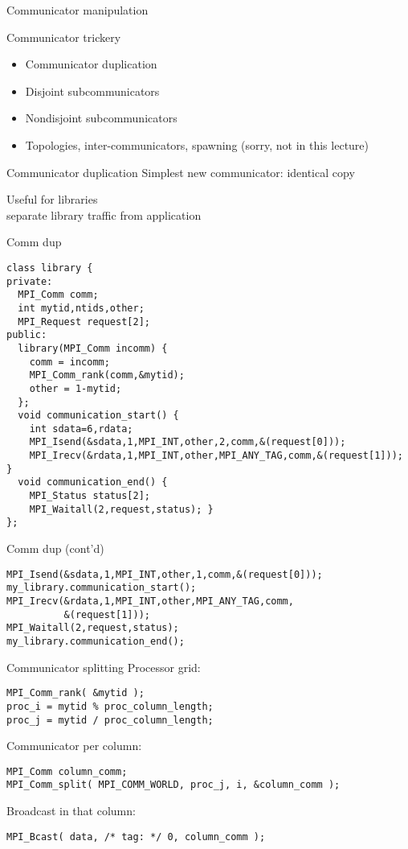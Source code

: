  {Communicator manipulation}

\begin{frame}[fragile]{Communicator trickery}
  \begin{itemize}
  \item Communicator duplication
  \item Disjoint subcommunicators
  \item Nondisjoint subcommunicators
  \item Topologies, inter-communicators, spawning (sorry, not in this lecture)
  \end{itemize}
\end{frame}

\begin{frame}[fragile]{Communicator duplication}
  Simplest new communicator: identical copy

  Useful for libraries\\
  separate library traffic from application
\end{frame}

\begin{frame}[fragile]{Comm dup}
\small
\begin{verbatim}
class library {
private:
  MPI_Comm comm;
  int mytid,ntids,other;
  MPI_Request request[2];
public:
  library(MPI_Comm incomm) {
    comm = incomm;
    MPI_Comm_rank(comm,&mytid);
    other = 1-mytid;
  };
  void communication_start() {
    int sdata=6,rdata;
    MPI_Isend(&sdata,1,MPI_INT,other,2,comm,&(request[0]));
    MPI_Irecv(&rdata,1,MPI_INT,other,MPI_ANY_TAG,comm,&(request[1])); }
  void communication_end() {
    MPI_Status status[2];
    MPI_Waitall(2,request,status); }
};
\end{verbatim}
\end{frame}

\begin{frame}[fragile]{Comm dup (cont'd)}
\small
\begin{verbatim}
MPI_Isend(&sdata,1,MPI_INT,other,1,comm,&(request[0]));
my_library.communication_start();
MPI_Irecv(&rdata,1,MPI_INT,other,MPI_ANY_TAG,comm,
          &(request[1]));
MPI_Waitall(2,request,status);
my_library.communication_end();
\end{verbatim}
\end{frame}

\begin{frame}[fragile]{Communicator splitting}
Processor grid:
\begin{verbatim}
MPI_Comm_rank( &mytid );
proc_i = mytid % proc_column_length;
proc_j = mytid / proc_column_length;
\end{verbatim}
Communicator per column:
\begin{verbatim}
MPI_Comm column_comm;
MPI_Comm_split( MPI_COMM_WORLD, proc_j, i, &column_comm );
\end{verbatim}
Broadcast in that column:
\begin{verbatim}
MPI_Bcast( data, /* tag: */ 0, column_comm );
\end{verbatim}
\end{frame}

